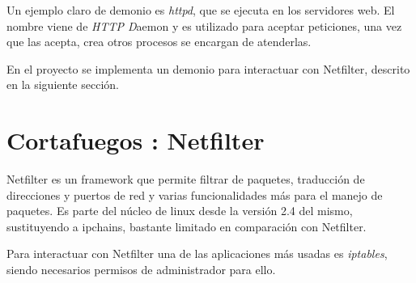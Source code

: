 Un ejemplo claro de demonio es \emph{httpd}, que se ejecuta en los servidores web. El nombre viene de \emph{HTTP D}aemon y es utilizado para aceptar peticiones, una vez que las acepta, crea otros procesos se encargan de atenderlas.
\newline

En el proyecto se implementa un demonio para interactuar con Netfilter, descrito en la siguiente sección.


\section{Cortafuegos : Netfilter}


Netfilter es un framework que permite filtrar de paquetes, traducci\'on de direcciones y puertos de red y varias funcionalidades m\'as para el manejo de paquetes. Es parte del n\'ucleo de linux desde la versi\'on 2.4 del mismo, sustituyendo a ipchains, bastante limitado en comparaci\'on con Netfilter.
\newline 
%
%


Para interactuar con Netfilter una de las aplicaciones más usadas es \emph{iptables}, siendo necesarios permisos de administrador para ello.

